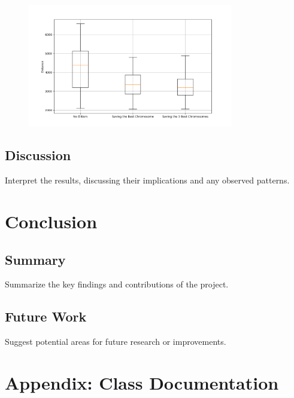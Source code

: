 \documentclass[11pt]{article}
\begin{document}
\begin{figure}
    \includegraphics[width=0.8\textwidth]{../results/elitism_boxplot.png}
    \label{fig:elitism}
\end{figure}


\subsection{Discussion}
Interpret the results, discussing their implications and any observed patterns.

\section{Conclusion}
\subsection{Summary}
Summarize the key findings and contributions of the project.

\subsection{Future Work}
Suggest potential areas for future research or improvements.

\newpage
\printbibliography

\appendix
\section{Appendix: Class Documentation}
\end{document}
